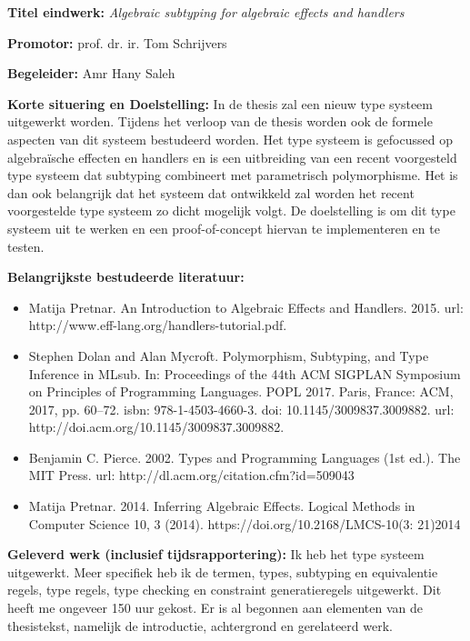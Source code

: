\documentclass[12pt]{report}
\begin{document}
\pagestyle{myheadings}
{\bf Titel eindwerk:} {\em Algebraic subtyping for algebraic effects and handlers}

\vspace{0.5cm}
{\bf Promotor:} prof. dr. ir. Tom Schrijvers

\vspace{0.5cm}
{\bf Begeleider:} Amr Hany Saleh

\vspace{1cm}
{\bf Korte situering en Doelstelling:} In de thesis zal een nieuw type systeem uitgewerkt worden. Tijdens het verloop van de thesis worden ook de formele aspecten van dit systeem bestudeerd worden. Het type systeem is gefocussed op algebraïsche effecten en handlers en is een uitbreiding van een recent voorgesteld type systeem dat subtyping combineert met parametrisch polymorphisme. Het is dan ook belangrijk dat het systeem dat ontwikkeld zal worden het recent voorgestelde type systeem zo dicht mogelijk volgt. De doelstelling is om dit type systeem uit te werken en een proof-of-concept hiervan te implementeren en te testen.

\vspace{1cm}
{\bf Belangrijkste bestudeerde literatuur:}
\begin{itemize}
\item Matija Pretnar. An Introduction to Algebraic Effects and Handlers. 2015. url: http://www.eff-lang.org/handlers-tutorial.pdf.
\item Stephen Dolan and Alan Mycroft. Polymorphism, Subtyping, and Type Inference in MLsub. In: Proceedings of the 44th ACM SIGPLAN Symposium on Principles of Programming Languages. POPL 2017. Paris, France: ACM, 2017, pp. 60–72. isbn: 978-1-4503-4660-3. doi: 10.1145/3009837.3009882. url: http://doi.acm.org/10.1145/3009837.3009882.
\item Benjamin C. Pierce. 2002. Types and Programming Languages (1st ed.). The MIT Press. url: http://dl.acm.org/citation.cfm?id=509043
\item Matija Pretnar. 2014. Inferring Algebraic Effects. Logical Methods in Computer Science 10, 3 (2014). https://doi.org/10.2168/LMCS-10(3: 21)2014
\end{itemize}

\vspace{1cm}
{\bf Geleverd werk (inclusief tijdsrapportering):} Ik heb het type systeem uitgewerkt. Meer specifiek heb ik de termen, types, subtyping en equivalentie regels, type regels, type checking en constraint generatieregels uitgewerkt. Dit heeft me ongeveer 150 uur gekost. Er is al begonnen aan elementen van de thesistekst, namelijk de introductie, achtergrond en gerelateerd werk. 
\end{document}
